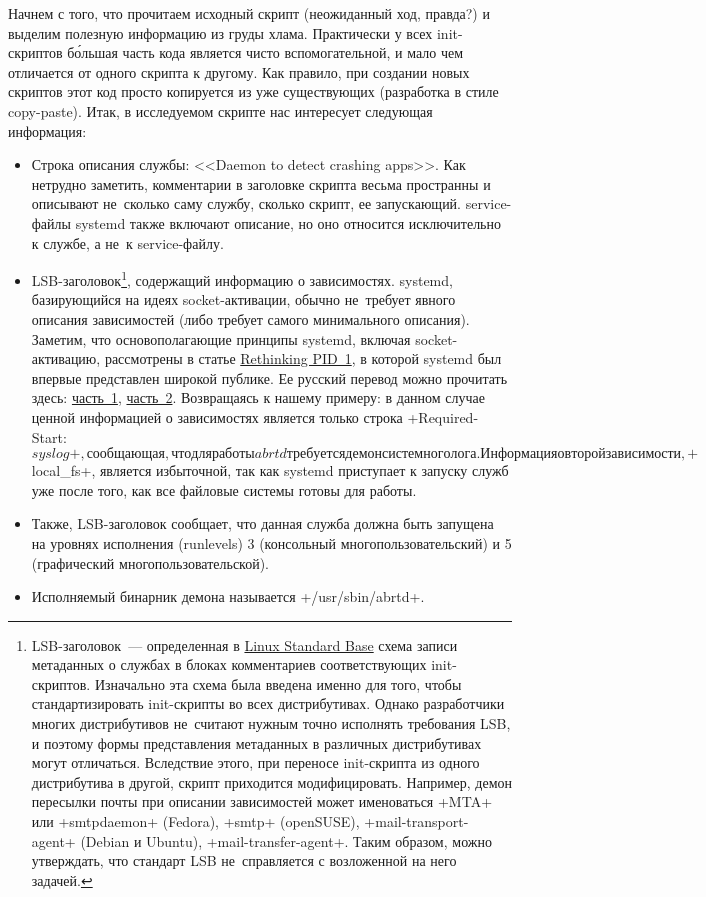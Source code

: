 \documentclass[10pt,oneside,a4paper]{article}
\begin{document}
Начнем с того, что прочитаем исходный скрипт (неожиданный ход, правда?) и
выделим полезную информацию из груды хлама. Практически у всех init-скриптов
б\'{о}льшая часть кода является чисто вспомогательной, и мало чем отличается от
одного скрипта к другому. Как правило, при создании новых скриптов этот код
просто копируется из уже существующих (разработка в стиле copy-paste). Итак,
в исследуемом скрипте нас интересует следующая информация: 

\begin{itemize}
	\item Строка описания службы: <<Daemon to detect crashing apps>>. Как
		нетрудно заметить, комментарии в заголовке скрипта весьма
		пространны и описывают не~сколько саму службу, сколько
		скрипт, ее запускающий. service-файлы systemd также включают
		описание, но оно относится исключительно к службе, а не~к
		service-файлу. 
	\item LSB-заголовок\footnote{LSB-заголовок~--- определенная в
		\href{http://refspecs.freestandards.org/LSB_3.1.1/LSB-Core-generic/LSB-Core-generic/initscrcomconv.html}{Linux
		Standard Base} схема записи метаданных о службах в блоках
		комментариев соответствующих init-скриптов. Изначально эта
		схема была введена именно для того, чтобы стандартизировать
		init-скрипты во всех дистрибутивах. Однако разработчики
		многих дистрибутивов не~считают нужным точно исполнять
		требования LSB, и поэтому формы представления метаданных в
		различных дистрибутивах могут отличаться. Вследствие этого,
		при переносе init-скрипта из одного дистрибутива в другой,
		скрипт приходится модифицировать. Например, демон пересылки
		почты при описании зависимостей может именоваться
		+MTA+ или +smtpdaemon+ (Fedora), +smtp+
		(openSUSE), +mail-transport-agent+ (Debian и Ubuntu),
		+mail-transfer-agent+. Таким образом, можно утверждать, что
		стандарт LSB не~справляется с возложенной на него задачей.},
		содержащий информацию о зависимостях.  systemd, базирующийся
		на идеях socket-активации, обычно не~требует явного описания
		зависимостей (либо требует самого минимального описания).
		Заметим, что основополагающие принципы systemd, включая
		socket-активацию, рассмотрены в статье
		\href{http://0pointer.de/blog/projects/systemd.html}{Rethinking
		PID~1}, в которой systemd был впервые представлен широкой
		публике. Ее русский перевод можно прочитать здесь:
		\href{http://tux-the-penguin.blogspot.com/2010/09/systemd.html}{часть~1},
		\href{http://tux-the-penguin.blogspot.com/2010/09/systemd-ii.html}{часть~2}.
		Возвращаясь к нашему примеру: в данном случае ценной
		информацией о зависимостях является только строка
		+Required-Start: $syslog+, сообщающая, что для работы
		abrtd требуется демон системного лога.  Информация о второй
		зависимости, +$local_fs+, является избыточной, так как
		systemd приступает к запуску служб уже после того, как все
		файловые системы готовы для работы. 
	\item Также, LSB-заголовок сообщает, что данная служба должна быть
		запущена на уровнях исполнения (runlevels) 3 (консольный
		многопользовательский) и 5 (графический
		многопользовательской).
	\item Исполняемый бинарник демона называется +/usr/sbin/abrtd+. 
\end{itemize}
\end{document}
